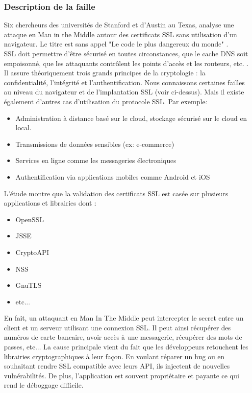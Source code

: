 		\subsubsection{Description de la faille}
		
			Six chercheurs des universités de Stanford et d'Austin au Texas, analyse une attaque en Man in the Middle autour des certificats SSL sans utilisation d'un navigateur. Le titre est sans appel "Le code le plus dangereux du monde" \cite{validate2012martin}.\\
			
			
			SSL doit permettre d'être sécurisé en toutes circonstances, que le cache DNS soit empoisonné, que les attaquants contrôlent les points d'accès et les routeurs, etc. . Il assure théoriquement trois grands principes de la cryptologie : la confidentialité, l'intégrité et l'authentification. Nous connaissons certaines failles au niveau du navigateur et de l'implantation SSL (voir ci-dessus). Mais il existe également d'autres cas d'utilisation du protocole SSL. Par exemple:
			\begin{itemize}
			\item Administration à distance basé sur le cloud, stockage sécurisé sur le cloud en local.
			\item Transmissions de données sensibles (ex: e-commerce)
			\item Services en ligne comme les messageries électroniques
			\item Authentification via applications mobiles comme Android et iOS\\
			\end{itemize}
			
			L'étude montre que la validation des certificats SSL est casée sur plusieurs applications et librairies dont :
			\begin{itemize}
			\item OpenSSL
			\item JSSE
			\item CryptoAPI
			\item NSS
			\item GnuTLS
			\item etc...\\
			\end{itemize} 
			
			En fait, un attaquant en Man In The Middle peut intercepter le secret entre un client et un serveur utilisant une connexion SSL. Il peut ainsi  récupérer des numéros de carte bancaire, avoir accès à une messagerie, récupérer des mots de passes, etc... La cause principale vient du fait que les développeurs retouchent les librairies cryptographiques à leur façon. En voulant réparer un bug ou en souhaitant rendre SSL compatible avec leurs API, ils injectent de nouvelles vulnérabilités. 	De plus, l'application est souvent propriétaire et payante ce qui rend le déboggage difficile.\\
			
